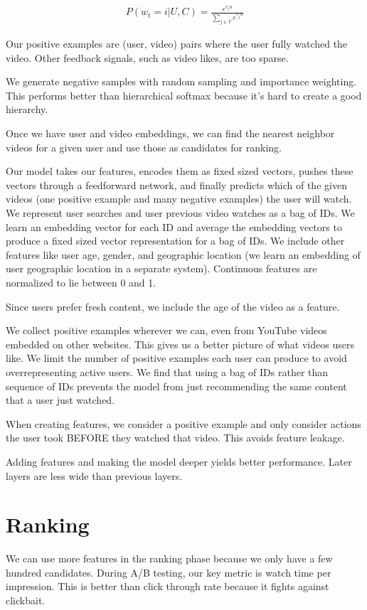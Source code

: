 \documentclass[a4paper]{article}
\begin{document}
\begin{align}
  P(w_t = i | U, C) = \frac{e^{v_i u}}{\sum_{j \in V}{e^{v_j u}}}
\end{align}

Our positive examples are (user, video) pairs where the user fully watched the
video. Other feedback signals, such as video likes, are too sparse.

We generate negative samples with random sampling and importance weighting. This
performs better than hierarchical softmax because it's hard to create a good
hierarchy.

Once we have user and video embeddings, we can find the nearest neighbor videos
for a given user and use those as candidates for ranking.

Our model takes our features, encodes them as fixed sized vectors, pushes these
vectors through a feedforward network, and finally predicts which of the
given videos (one positive example and many negative examples) the user will
watch. We represent user searches and user previous video watches as a bag of IDs.
We learn an embedding vector for each ID and average the embedding vectors to
produce a fixed sized vector representation for a bag of IDs. We include other
features like user age, gender, and geographic location (we learn an embedding
of user geographic location in a separate system). Continuous features are
normalized to lie between 0 and 1.

Since users prefer fresh content, we include the age of the video as a feature.

We collect positive examples wherever we can, even from YouTube videos embedded
on other websites. This gives us a better picture of what videos users like.
We limit the number of positive examples each user can produce to avoid
overrepresenting active users. We find that using a bag of IDs rather than
sequence of IDs prevents the model from just recommending the same content that
a user just watched.

When creating features, we consider a positive example and only consider actions
the user took BEFORE they watched that video. This avoids feature leakage.

Adding features and making the model deeper yields better performance. Later
layers are less wide than previous layers.

\section{Ranking}
We can use more features in the ranking phase because we only have a few hundred
candidates. During A/B testing, our key metric is watch time per impression.
This is better than click through rate because it fights against clickbait.
\end{document}
